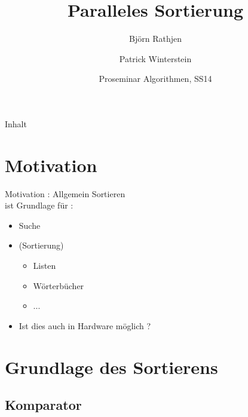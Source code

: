 \documentclass[ucs,9pt]{beamer}
\title[Para Sort] %
{Paralleles Sortierung}
\author[] %
{Björn Rathjen \and Patrick Winterstein}
\institute[FU Berlin] %
{Freie Universität Berlin}
\date[ProSem Algo]
{Proseminar Algorithmen, SS14}
\begin{document}
\begin{frame}[plain]
  \titlepage
\end{frame}
 
\begin{frame}{Inhalt}
\end{frame}


\section{Motivation}

\begin{frame}{Motivation : Allgemein}
Sortieren \\
    ist Grundlage für :
    \begin{itemize}
        \item Suche
        \item (Sortierung)
        \begin{itemize}
            \item Listen
            \item Wörterbücher
            \item ... 
        \end{itemize}
        \item Ist dies auch in Hardware möglich ?
    \end{itemize}
\end{frame}

\section{Grundlage des Sortierens}
\subsection{Komparator}
\end{document}
